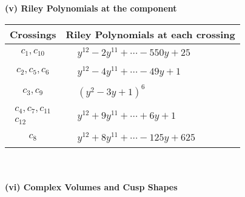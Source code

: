 \documentclass[1p]{elsarticle_modified}
\theoremstyle{definition}
\begin{document}
\newpage\renewcommand{\arraystretch}{1}
\flushleft \textbf{(v) Riley Polynomials at the component}\newline \\
\begin{tabular}{m{50pt}|m{274pt}}
Crossings & \hspace{64pt}Riley Polynomials at each crossing \\
\hline $$\begin{aligned}c_{1},c_{10}\end{aligned}$$&$\begin{aligned}
&y^{12}-2 y^{11}+\cdots-550 y+25
\end{aligned}$\\
\hline $$\begin{aligned}c_{2},c_{5},c_{6}\end{aligned}$$&$\begin{aligned}
&y^{12}-4 y^{11}+\cdots-49 y+1
\end{aligned}$\\
\hline $$\begin{aligned}c_{3},c_{9}\end{aligned}$$&$\begin{aligned}
&(y^2-3 y+1)^6
\end{aligned}$\\
\hline $$\begin{aligned}c_{4},c_{7},c_{11}\\c_{12}\end{aligned}$$&$\begin{aligned}
&y^{12}+9 y^{11}+\cdots+6 y+1
\end{aligned}$\\
\hline $$\begin{aligned}c_{8}\end{aligned}$$&$\begin{aligned}
&y^{12}+8 y^{11}+\cdots-125 y+625
\end{aligned}$\\
\hline
\end{tabular}\\~\\
\newpage\flushleft \textbf{(vi) Complex Volumes and Cusp Shapes}
\end{document}

